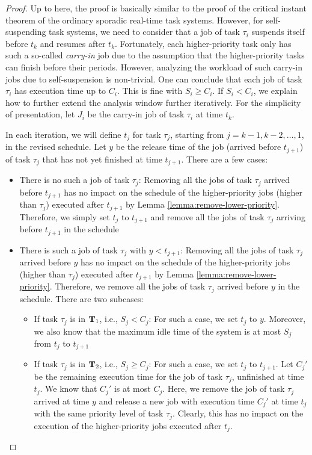 \begin{proof}
Up to here, the proof is basically similar to the proof of the critical instant theorem of the ordinary sporadic real-time task systems. However, for self-suspending task systems, we need to consider that a job of task $\tau_i$ suspends itself before $t_k$ and resumes after $t_k$.  Fortunately, each higher-priority task only has such a so-called \emph{carry-in} job due to the assumption that the higher-priority tasks can finish before their periods. However, analyzing the workload of such carry-in jobs due to self-suspension is non-trivial. One can conclude that each job of task $\tau_i$ has execution time up to $C_i$. This is fine with $S_i \geq C_i$. If $S_i < C_i$, we explain how to further extend the analysis window further iteratively. For the simplicity of presentation, let $J_i$ be the carry-in job of task $\tau_i$ at time $t_k$.


In each iteration, we will define $t_j$ for task $\tau_j$, starting from $j=k-1, k-2, \ldots, 1$, in the revised schedule. Let $y$ be the release time of the job (arrived before $t_{j+1}$) of task $\tau_j$ that has not yet finished at time $t_{j+1}$. There are a few cases:
\begin{itemize}
\item There is no such a job of task $\tau_j$: Removing all the jobs of task $\tau_j$ arrived before $t_{j+1}$ has no impact on the schedule of the higher-priority jobs (higher than $\tau_j$) executed after $t_{j+1}$ by Lemma \ref{lemma:remove-lower-priority}. Therefore, we simply set $t_j$ to $t_{j+1}$ and remove all the jobs of task $\tau_j$ arriving before $t_{j+1}$ in the schedule
\item There is such a job of task $\tau_j$ with $y < t_{j+1}$:  Removing all the jobs of task $\tau_j$ arrived before $y$ has no impact on the schedule of the higher-priority jobs (higher than $\tau_j$) executed after $t_{j+1}$ by Lemma \ref{lemma:remove-lower-priority}. Therefore, we remove all the jobs of task $\tau_j$ arrived before $y$ in the schedule. There are two subcases:
\begin{itemize}
\item If task $\tau_j$ is in ${\bf T}_1$, i.e., $S_j < C_j$: For such a case, we set $t_{j}$ to $y$. Moreover, we also know that the maximum idle time of the system is at most $S_j$ from $t_j$ to $t_{j+1}$
\item If task $\tau_j$ is in ${\bf T}_2$, i.e., $S_j \geq C_j$: For such a case, we set $t_{j}$ to $t_{j+1}$. Let $C_j'$ be the remaining execution time for the job of task $\tau_j$, unfinished at time $t_j$. We know that $C_j'$ is at most $C_j$. Here, we remove the job of task $\tau_j$ arrived at time $y$ and release a new job with execution time $C_j'$  at time $t_j$ with the same priority level of task $\tau_j$. Clearly, this has no impact on the execution of the higher-priority jobs executed after $t_j$.
\end{itemize}
\end{itemize}
 

\end{proof}
